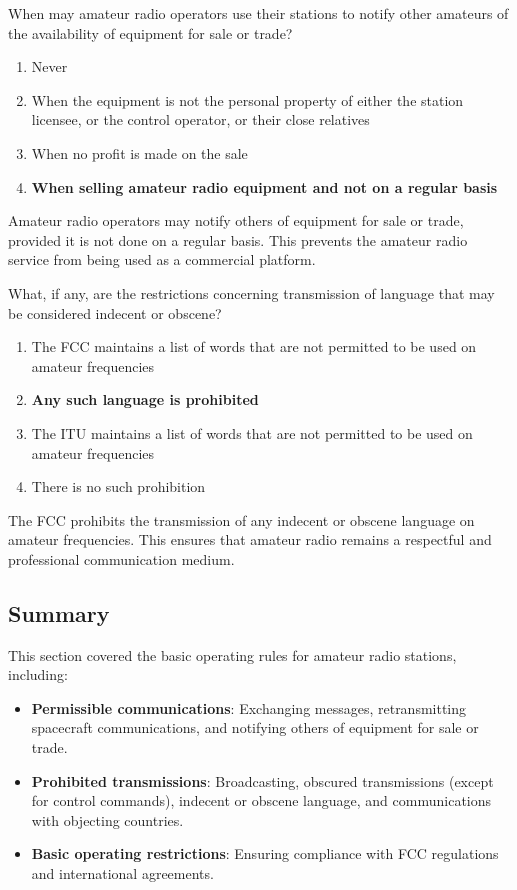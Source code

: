 \begin{tcolorbox}[colback=gray!10!white,colframe=black!75!black,title={T1D05}]
    When may amateur radio operators use their stations to notify other amateurs of the availability of equipment for sale or trade?
    \begin{enumerate}[label=\Alph*),noitemsep]
        \item Never
        \item When the equipment is not the personal property of either the station licensee, or the control operator, or their close relatives
        \item When no profit is made on the sale
        \item \textbf{When selling amateur radio equipment and not on a regular basis}
    \end{enumerate}
\end{tcolorbox}
Amateur radio operators may notify others of equipment for sale or trade, provided it is not done on a regular basis. This prevents the amateur radio service from being used as a commercial platform.


\begin{tcolorbox}[colback=gray!10!white,colframe=black!75!black,title={T1D06}]
    What, if any, are the restrictions concerning transmission of language that may be considered indecent or obscene?
    \begin{enumerate}[label=\Alph*),noitemsep]
        \item The FCC maintains a list of words that are not permitted to be used on amateur frequencies
        \item \textbf{Any such language is prohibited}
        \item The ITU maintains a list of words that are not permitted to be used on amateur frequencies
        \item There is no such prohibition
    \end{enumerate}
\end{tcolorbox}
The FCC prohibits the transmission of any indecent or obscene language on amateur frequencies. This ensures that amateur radio remains a respectful and professional communication medium.


\subsection*{Summary}
This section covered the basic operating rules for amateur radio stations, including:
\begin{itemize}
    \item \textbf{Permissible communications}: Exchanging messages, retransmitting spacecraft communications, and notifying others of equipment for sale or trade.
    \item \textbf{Prohibited transmissions}: Broadcasting, obscured transmissions (except for control commands), indecent or obscene language, and communications with objecting countries.
    \item \textbf{Basic operating restrictions}: Ensuring compliance with FCC regulations and international agreements.
\end{itemize}
